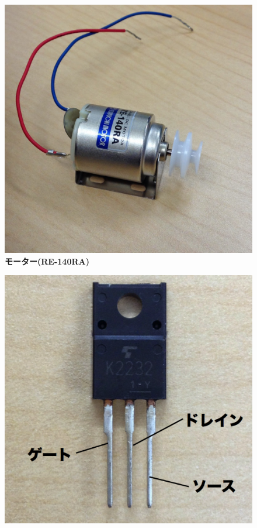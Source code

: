 \documentclass[11pt,a4paper]{jarticle}
\begin{document}
\begin{figure}[h!]
 \begin{minipage}{0.32\columnwidth}
  \centering
  \includegraphics[width=\columnwidth]{img/motor.eps}
  \textbf{モーター(RE-140RA)}
 \end{minipage}
 \begin{minipage}{0.32\columnwidth}
  \centering
  \includegraphics[width=\columnwidth]{img/fet.eps}

\end{minipage}
\end{figure}
\end{document}
